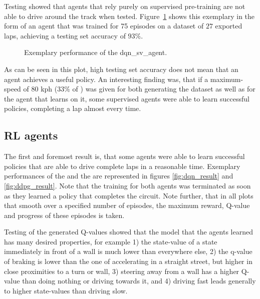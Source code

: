 Testing showed that agents that rely purely on supervised pre-training are not able to drive around the track when tested. Figure~\ref{fig:sv_result} shows this exemplary in the form of an agent that was trained for 75 episodes on a dataset of $27$ exported laps, achieving a testing set accuracy of $93\%$.

\begin{figure}[h]
	{%
		\setlength{\fboxsep}{0pt}%
		\setlength{\fboxrule}{1pt}%
	}%
	\centering
	\caption[Exemplary performance of the dqn\_sv\_agent]{Exemplary performance of the dqn\_sv\_agent.}
	\label{fig:sv_result}
\end{figure}

As can be seen in this plot, high testing set accuracy does not mean that an agent achieves a useful policy. An interesting finding was, that if a maximum-speed of $80$ kph ($33\%$ of ) was given for both generating the dataset as well as for the agent that learns on it, some supervised agents were able to learn successful policies, completing a lap almost every time.

\subsection{RL agents}

The first and foremost result is, that some agents were able to learn successful policies that are able to drive complete laps in a reasonable time. Exemplary performances of the  and the  are represented in figures \ref{fig:dqn_result} and \ref{fig:ddpg_result}. Note that the training for both agents was terminated as soon as they learned a policy that completes the circuit. Note further, that in all plots that smooth over a specified number of episodes, the maximum reward, Q-value and progress of these episodes is taken.

Testing of the generated Q-values showed that the model that the agents learned has many desired properties, for example 1) the state-value of a state immediately in front of a wall is much lower than everywhere else, 2) the q-value of braking is lower than the one of accelerating in a straight street, but higher in close proximities to a turn or wall, 3) steering away from a wall has a higher Q-value than doing nothing or driving towards it, and 4) driving fast leads generally to higher state-values than driving slow. 

